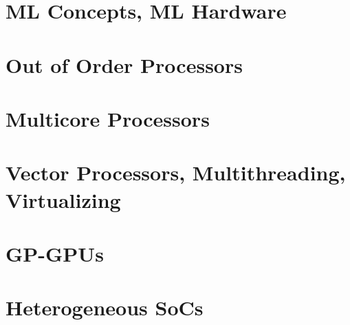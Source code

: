 \documentclass[a4paper, fontsize=8pt, landscape, DIV=1]{scrartcl}
\begin{document}
\begin{multicols*}{4}
  \section{ML Concepts, ML Hardware}


  \section{Out of Order Processors}


  \section{Multicore Processors}


  \section{Vector Processors, Multithreading, Virtualizing}


  \section{GP-GPUs}


  \section{Heterogeneous SoCs}



    
\end{multicols*}

\setcounter{secnumdepth}{2}
\end{document}
